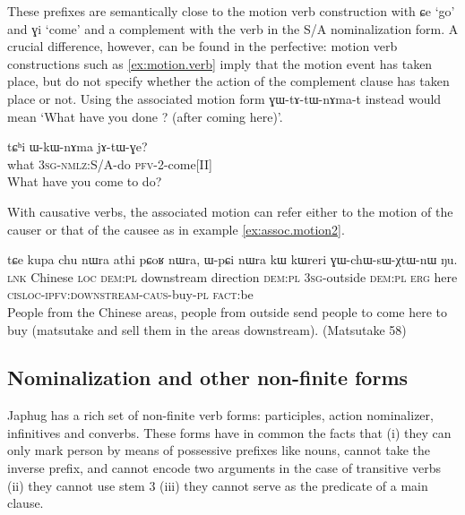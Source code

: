 \documentclass[oldfontcommands,oneside,a4paper,11pt]{article}
\newcommand{\ipa}[1]{{\phon #1}} %
\begin{document}
These prefixes are semantically close to the motion verb construction with \ipa{ɕe} `go' and \ipa{ɣi} `come' and a complement with the verb in the S/A nominalization form. A crucial difference, however, can be found in the perfective:  motion verb constructions such as \ref{ex:motion.verb} imply that the motion event has taken place, but do not specify whether the action of the complement clause has taken place or not. Using the associated motion form \ipa{ɣɯ-tɤ-tɯ-nɤma-t} instead would mean `What have you done ? (after coming here)'.

\begin{exe}
\ex \label{ex:motion.verb}
\gll
\ipa{tɕʰi} 	\ipa{ɯ-kɯ-nɤma} 	\ipa{jɤ-tɯ-ɣe?} \\
what \textsc{3sg-nmlz:}S/A-do \textsc{pfv-2}-come[II] \\
\glt What have you come to do?
\end{exe}


With causative verbs, the associated motion can refer either to the motion of the causer or that of the causee as in example \ref{ex:assoc.motion2}.

  \begin{exe}
\ex \label{ex:assoc.motion2}
\gll
\ipa{tɕe} 	\ipa{kupa} 	\ipa{chu} 	\ipa{nɯra} 	\ipa{athi} 	\ipa{pɕoʁ} 	\ipa{nɯra,} 	\ipa{ɯ-pɕi} 	\ipa{nɯra} 	\ipa{kɯ} 	\ipa{kɯreri} 	\ipa{ɣɯ-chɯ-sɯ-χtɯ-nɯ} 	\ipa{ŋu.}  \\
\textsc{lnk} Chinese \textsc{loc} \textsc{dem:pl} downstream direction \textsc{dem:pl} \textsc{3sg}-outside  \textsc{dem:pl}  \textsc{erg} here \textsc{cisloc-ipfv:downstream-caus}-buy-\textsc{pl} \textsc{fact}:be \\
\glt People from the Chinese areas, people from outside send people to come here to buy (matsutake and sell them in the areas downstream). (Matsutake 58)
  \end{exe} 


\subsection{Nominalization and other non-finite forms}

Japhug has a rich set of non-finite verb forms: participles, action nominalizer, infinitives and converbs. These forms have in common the facts that (i) they can only mark person by means of possessive prefixes like nouns, cannot take the inverse prefix, and cannot encode two arguments in the case of transitive verbs (ii) they cannot use stem 3 (iii) they cannot serve as the predicate of a main clause.
\end{document}

